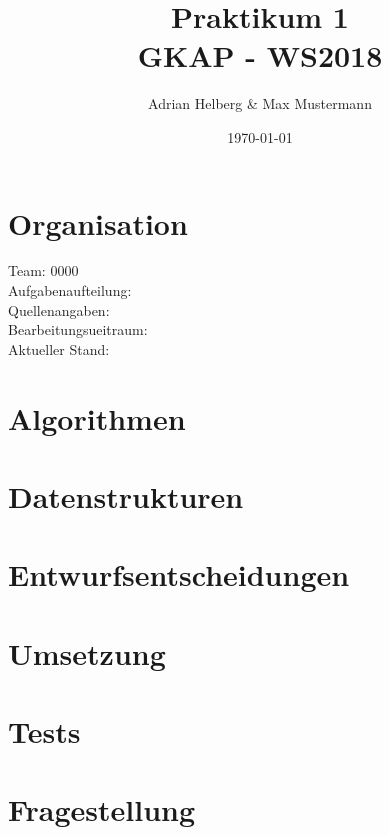 \documentclass[a4paper]{article}
\title{Praktikum 1\\
    \small{GKAP - WS2018}}
\author{Adrian Helberg \& Max Mustermann}
\date{\today}
\begin{document}
    \maketitle

    \tableofcontents
    \newpage

    	\section{Organisation}
		Team: 0000\\
		Aufgabenaufteilung:\\
		Quellenangaben:\\
		Bearbeitungsueitraum:\\
		Aktueller Stand:\\

    	\section{Algorithmen}

	\section{Datenstrukturen}

	\section{Entwurfsentscheidungen}

	\section{Umsetzung}

	\section{Tests}

	\section{Fragestellung}
	
\end{document}
